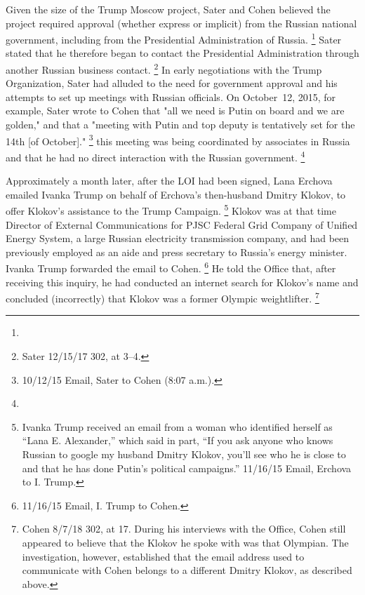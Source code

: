 Given the size of the Trump Moscow project, Sater and Cohen believed the project required approval (whether express or implicit) from the Russian national government, including from the Presidential Administration of Russia.%
\footnote{}
Sater stated that he therefore began to contact the Presidential Administration through another Russian business contact.%
\footnote{Sater 12/15/17 302, at 3--4.}
In early negotiations with the Trump Organization, Sater had alluded to the need for government approval and his attempts to set up meetings with Russian officials.
On October~12, 2015, for example, Sater wrote to Cohen that "all we need is Putin on board and we are golden," and that a "meeting with Putin and top deputy is tentatively set for the 14th [of October]."%
\footnote{10/12/15 Email, Sater to Cohen (8:07 a.m.).}
 this meeting was being coordinated by associates in Russia and that he had no direct interaction with the Russian government.%
\footnote{}

Approximately a month later, after the LOI had been signed, Lana Erchova emailed Ivanka Trump on behalf of Erchova's then-husband Dmitry Klokov, to offer Klokov's assistance to the Trump Campaign.%
\footnote{Ivanka Trump received an email from a woman who identified herself as “Lana E. Alexander,” which said in part, “If you ask anyone who knows Russian to google my husband Dmitry Klokov, you'll see who he is close to and that he has done Putin's political campaigns.”
11/16/15 Email, Erchova to I. Trump.}
Klokov was at that time Director of External Communications for PJSC Federal Grid Company of Unified Energy System, a large Russian electricity transmission company, and had been previously employed as an aide and press secretary to Russia's energy minister.
Ivanka Trump forwarded the email to Cohen.%
\footnote{11/16/15 Email, I. Trump to Cohen.}
He told the Office that, after receiving this inquiry, he had conducted an internet search for Klokov's name and concluded (incorrectly) that Klokov was a former Olympic weightlifter.%
\footnote{Cohen 8/7/18 302, at 17.
During his interviews with the Office, Cohen still appeared to believe that the Klokov he spoke with was that Olympian.
The investigation, however, established that the email address used to communicate with Cohen belongs to a different Dmitry Klokov, as described above.}

